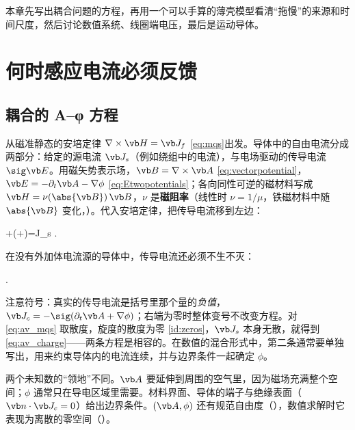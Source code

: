 
本章先写出耦合问题的方程，再用一个可以手算的薄壳模型看清“拖慢”的来源和时间尺度，然后讨论数值系统、线圈端电压，最后是运动导体。

\section{何时感应电流必须反馈}\label{sec:eddy-coupled}

\subsection{耦合的 A--φ 方程}
从磁准静态的安培定律 $\nabla\times\vb H=\vb J_f$ \eqref{eq:mqs}出发。导体中的自由电流分成两部分：给定的源电流 $\vb J_s$（例如绕组中的电流），与电场驱动的传导电流 $\sig\vb E$。用磁矢势表示场，$\vb B=\nabla\times\vb A$ \eqref{eq:vectorpotential}，$\vb E=-\partial_t\vb A-\nabla\phi$ \eqref{eq:Etwopotentials}；各向同性可逆的磁材料写成 $\vb H=\nu(\abs{\vb B})\,\vb B$，$\nu$ 是\textbf{磁阻率}（线性时 $\nu=1/\mu$，铁磁材料中随 $\abs{\vb B}$ 变化，）。代入安培定律，把传导电流移到左边：
\begin{keyeq}
\nabla\times{}+\sig\Bigl(+\nabla\phi\Bigr)=\vb J_s .
\label{eq:av_mqs}
\end{keyeq}
在没有外加体电流源的导体中，传导电流还必须不生不灭：
\begin{keyeq}
\nabla\cdot{} .
\label{eq:av_charge}
\end{keyeq}
注意符号：真实的传导电流是括号里那个量的\emph{负值}，$\vb J_c=-\sig(\partial_t\vb A+\nabla\phi)$；右端为零时整体变号不改变方程。对 \eqref{eq:av_mqs} 取散度，旋度的散度为零 \eqref{id:zeros}，$\vb J_s$ 本身无散，就得到 \eqref{eq:av_charge}——两条方程是相容的。在数值的混合形式中，第二条通常要单独写出，用来约束导体内的电流连续，并与边界条件一起确定 $\phi$。

两个未知数的“领地”不同。$\vb A$ 要延伸到周围的空气里，因为磁场充满整个空间；$\phi$ 通常只在导电区域里需要。材料界面、导体的端子与绝缘表面（$\vb n\cdot\vb J_c=0$）给出边界条件。$(\vb A,\phi)$ 还有规范自由度（），数值求解时它表现为离散的零空间（）。

